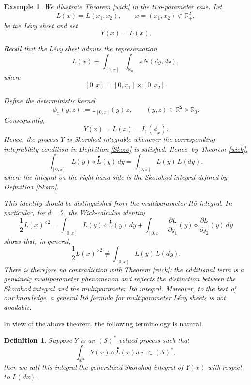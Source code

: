 \documentclass[12pt]{article}%
\newtheorem{definition}[theorem]{Definition}
\newtheorem{example}[theorem]{Example}
\numberwithin{equation}{section}
\begin{document}
\begin{example}
We illustrate Theorem \ref{wick} in the two-parameter case.
Let
\[
L(x)=L(x_1,x_2), \qquad x=(x_1,x_2)\in\mathbb{R}_+^2,
\]
be the L\' evy sheet and set
\[
Y(x)=L(x).
\]

Recall that the L\' evy sheet admits the representation
\[
L(x)
=
\int_{[0,x]}\int_{\mathbb{R}_0}
z\,\widetilde{N}(dy,dz),
\]
where
\[
[0,x]=[0,x_1]\times[0,x_2].
\]

Define the deterministic kernel
\[
\phi_x(y,z)
:=
\mathbf{1}_{[0,x]}(y)\,z,
\qquad
(y,z)\in\mathbb{R}^2\times\mathbb{R}_0.
\]
Consequently,
\[
Y(x)=L(x)=I_1(\phi_x).
\]
Hence, the process \(Y\) is Skorohod integrable
whenever the corresponding integrability condition in Definition
\ref{Skoro} is satisfied. Hence, by Theorem \ref{wick},
\[
\int_{[0,x]}L(y)\diamond\overset{\bullet} L(y)\,dy
=
\int_{[0,x]}L(y)\,L(dy),
\]
where the integral on the right-hand side is the Skorohod integral
defined by Definition \ref{Skoro}.

This identity should be distinguished from the multiparameter It\^o
integral. In particular, for \(d=2\), the Wick-calculus identity
\[
\frac12 L(x)^{\diamond2}
=
\int_{[0,x]}L(y)\diamond\overset{\bullet} L(y)\,dy
+
\int_{[0,x]}
\frac{\partial L}{\partial y_1}(y)
\diamond
\frac{\partial L}{\partial y_2}(y)\,dy
\]
shows that, in general,
\[
\frac12 L(x)^{\diamond2}
\neq
\int_{[0,x]}L(y)\,L(dy).
\]
There is therefore no contradiction with Theorem \ref{wick}: the
additional term is a genuinely multiparameter phenomenon and reflects
the distinction between the Skorohod integral and the multiparameter
It\^o integral. Moreover, to the best of our knowledge, a general
It\^o formula for multiparameter L\'evy sheets is not available.
\end{example}

\vspace{2mm} In view of the above theorem, the following terminology is natural.

\begin{definition}
\label{Wick-definition6.16} Suppose $Y$ is an $(\mathcal{S})^{\ast}$-valued
process such that
\[
\int_{\mathbb{R}^d}Y(x)\diamond\overset{\bullet}{L}(x)dx:\in(\mathcal{S})^{\ast
},
\]
then we call this integral \emph{the generalized Skorohod integral of $Y(x)$} with respect to $L(dx)$.
\end{definition}
\end{document}

